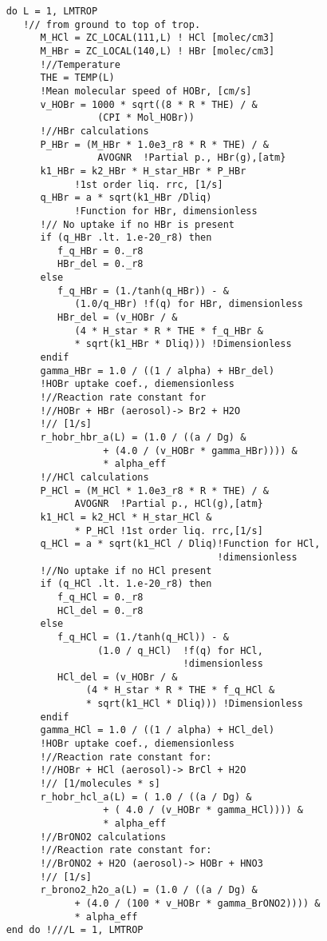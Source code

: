 \begin{lstlisting}
    do L = 1, LMTROP
       !// from ground to top of trop.
          M_HCl = ZC_LOCAL(111,L) ! HCl [molec/cm3]
          M_HBr = ZC_LOCAL(140,L) ! HBr [molec/cm3]
          !//Temperature
          THE = TEMP(L)
          !Mean molecular speed of HOBr, [cm/s]
          v_HOBr = 1000 * sqrt((8 * R * THE) / &
                    (CPI * Mol_HOBr))
          !//HBr calculations
          P_HBr = (M_HBr * 1.0e3_r8 * R * THE) / &
                    AVOGNR  !Partial p., HBr(g),[atm}
          k1_HBr = k2_HBr * H_star_HBr * P_HBr 
                !1st order liq. rrc, [1/s]
          q_HBr = a * sqrt(k1_HBr /Dliq)       
                !Function for HBr, dimensionless
          !// No uptake if no HBr is present
          if (q_HBr .lt. 1.e-20_r8) then
             f_q_HBr = 0._r8
             HBr_del = 0._r8
          else
             f_q_HBr = (1./tanh(q_HBr)) - &
                (1.0/q_HBr) !f(q) for HBr, dimensionless
             HBr_del = (v_HOBr / &
                (4 * H_star * R * THE * f_q_HBr &
                * sqrt(k1_HBr * Dliq))) !Dimensionless
          endif
          gamma_HBr = 1.0 / ((1 / alpha) + HBr_del)
          !HOBr uptake coef., diemensionless
          !//Reaction rate constant for 
          !//HOBr + HBr (aerosol)-> Br2 + H2O
          !// [1/s]
          r_hobr_hbr_a(L) = (1.0 / ((a / Dg) &
                     + (4.0 / (v_HOBr * gamma_HBr)))) &
                     * alpha_eff
          !//HCl calculations
          P_HCl = (M_HCl * 1.0e3_r8 * R * THE) / &
                AVOGNR  !Partial p., HCl(g),[atm}
          k1_HCl = k2_HCl * H_star_HCl &
                * P_HCl !1st order liq. rrc,[1/s]
          q_HCl = a * sqrt(k1_HCl / Dliq)!Function for HCl, 
                                         !dimensionless
          !//No uptake if no HCl present
          if (q_HCl .lt. 1.e-20_r8) then
             f_q_HCl = 0._r8
             HCl_del = 0._r8
          else
             f_q_HCl = (1./tanh(q_HCl)) - &
                    (1.0 / q_HCl)  !f(q) for HCl, 
                                   !dimensionless
             HCl_del = (v_HOBr / &
                  (4 * H_star * R * THE * f_q_HCl &
                  * sqrt(k1_HCl * Dliq))) !Dimensionless
          endif
          gamma_HCl = 1.0 / ((1 / alpha) + HCl_del)
          !HOBr uptake coef., diemensionless
          !//Reaction rate constant for: 
          !//HOBr + HCl (aerosol)-> BrCl + H2O
          !// [1/molecules * s]
          r_hobr_hcl_a(L) = ( 1.0 / ((a / Dg) &
                     + ( 4.0 / (v_HOBr * gamma_HCl)))) &
                     * alpha_eff
          !//BrONO2 calculations
          !//Reaction rate constant for: 
          !//BrONO2 + H2O (aerosol)-> HOBr + HNO3
          !// [1/s]
          r_brono2_h2o_a(L) = (1.0 / ((a / Dg) &
                + (4.0 / (100 * v_HOBr * gamma_BrONO2)))) &
                * alpha_eff
    end do !///L = 1, LMTROP

\end{lstlisting}



%

%